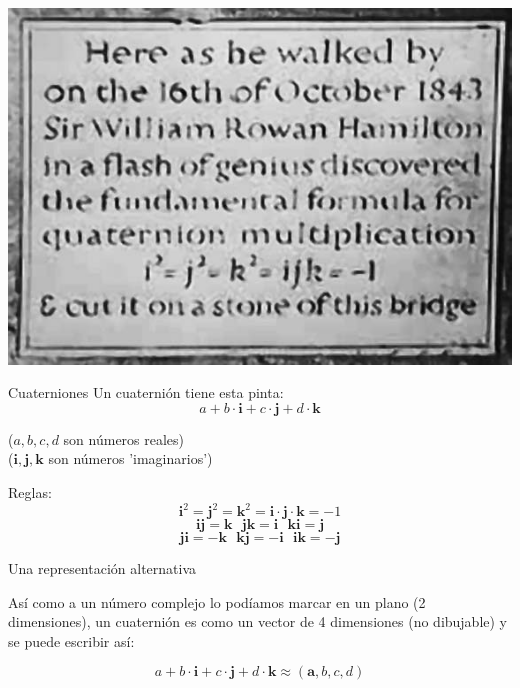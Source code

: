 \documentclass[10pt]{beamer}
\begin{document}
\begin{frame}

\includegraphics[scale=0.7]{hamilton.png}

\end{frame}

\begin{frame}{Cuaterniones}
Un cuaternión tiene esta pinta:
$$a +b\cdot \textbf{i} + c \cdot \textbf{j} + d \cdot \textbf{k}$$

	($a,b,c,d$ son números reales)  \\
	($\textbf{i},\textbf{j},\textbf{k}$ son números 'imaginarios')  \newline
	
	

\center	Reglas:
	$$\textbf{i}^2 = \textbf{j}^2 = \textbf{k}^2 = \textbf{i}\cdot\textbf{j}\cdot\textbf{k} = -1$$  	
	$$\textbf{ij}=\textbf{k}\ \ \ \textbf{jk}=\textbf{i}\ \ \ \textbf{ki}=\textbf{j}$$
	$$\textbf{ji}=-\textbf{k}\ \ \ \textbf{kj}=-\textbf{i}\ \ \ \textbf{ik}=-\textbf{j}$$ 
	
\end{frame}

\begin{frame}{Una representación alternativa}

Así como a un número complejo lo podíamos marcar en un plano (2 dimensiones), un cuaternión es como un vector de 4 dimensiones (no dibujable) y se puede escribir así:

$$a +b\cdot \textbf{i} + c \cdot \textbf{j} + d \cdot \textbf{k} \approx (\textbf{a},b,c,d)$$



\end{frame}
\end{document}
